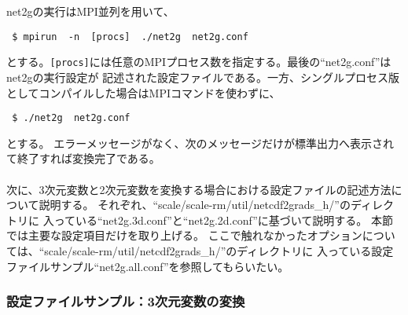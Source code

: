 net2gの実行はMPI並列を用いて、
\begin{verbatim}
 $ mpirun  -n  [procs]  ./net2g  net2g.conf
\end{verbatim}
とする。\verb|[procs]|には任意のMPIプロセス数を指定する。最後の``net2g.conf''はnet2gの実行設定が
記述された設定ファイルである。一方、シングルプロセス版としてコンパイルした場合はMPIコマンドを使わずに、
\begin{verbatim}
 $ ./net2g  net2g.conf
\end{verbatim}
とする。
エラーメッセージがなく、次のメッセージだけが標準出力へ表示されて終了すれば変換完了である。\\

\\

次に、3次元変数と2次元変数を変換する場合における設定ファイルの記述方法について説明する。
それぞれ、``scale/scale-rm/util/netcdf2grads\_h/''のディレクトリに
入っている``net2g.3d.conf''と``net2g.2d.conf''に基づいて説明する。
本節では主要な設定項目だけを取り上げる。
ここで触れなかったオプションについては、``scale/scale-rm/util/netcdf2grads\_h/''のディレクトリに
入っている設定ファイルサンプル``net2g.all.conf''を参照してもらいたい。


\subsubsection{設定ファイルサンプル：3次元変数の変換}

\\

